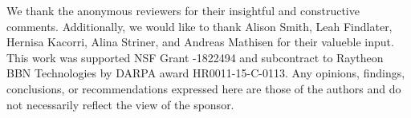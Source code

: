 \documentclass[sigconf]{acmart}
\begin{document}









\begin{acks}
We thank the anonymous reviewers for their insightful and constructive
comments.  Additionally, we would like to thank Alison Smith, Leah
Findlater, Hernisa Kacorri, Alina Striner, and Andreas Mathisen for
their valueble input.
This work was supported NSF Grant -1822494 and subcontract to
Raytheon BBN Technologies by DARPA award HR0011-15-C-0113.
Any opinions, findings,
conclusions, or recommendations expressed here are those of the
authors and do not necessarily reflect the view of the sponsor.

\end{acks}



\end{document}

